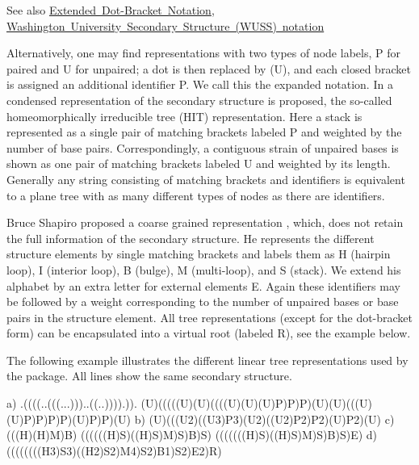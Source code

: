 \begin{DoxySeeAlso}{See also}
\mbox{\hyperlink{rna_structure_notations_dot-bracket-ext-notation}{Extended Dot-\/\+Bracket Notation}}, \mbox{\hyperlink{rna_structure_notations_wuss-notation}{Washington University Secondary Structure (W\+U\+SS) notation}}
\end{DoxySeeAlso}
Alternatively, one may find representations with two types of node labels, \textquotesingle{}P\textquotesingle{} for paired and \textquotesingle{}U\textquotesingle{} for unpaired; a dot is then replaced by \textquotesingle{}(U)\textquotesingle{}, and each closed bracket is assigned an additional identifier \textquotesingle{}P\textquotesingle{}. We call this the expanded notation. In \cite{fontana:1993b} a condensed representation of the secondary structure is proposed, the so-\/called homeomorphically irreducible tree (H\+IT) representation. Here a stack is represented as a single pair of matching brackets labeled \textquotesingle{}P\textquotesingle{} and weighted by the number of base pairs. Correspondingly, a contiguous strain of unpaired bases is shown as one pair of matching brackets labeled \textquotesingle{}U\textquotesingle{} and weighted by its length. Generally any string consisting of matching brackets and identifiers is equivalent to a plane tree with as many different types of nodes as there are identifiers.

Bruce Shapiro proposed a coarse grained representation \cite{shapiro:1988}, which, does not retain the full information of the secondary structure. He represents the different structure elements by single matching brackets and labels them as \textquotesingle{}H\textquotesingle{} (hairpin loop), \textquotesingle{}I\textquotesingle{} (interior loop), \textquotesingle{}B\textquotesingle{} (bulge), \textquotesingle{}M\textquotesingle{} (multi-\/loop), and \textquotesingle{}S\textquotesingle{} (stack). We extend his alphabet by an extra letter for external elements \textquotesingle{}E\textquotesingle{}. Again these identifiers may be followed by a weight corresponding to the number of unpaired bases or base pairs in the structure element. All tree representations (except for the dot-\/bracket form) can be encapsulated into a virtual root (labeled \textquotesingle{}R\textquotesingle{}), see the example below.

The following example illustrates the different linear tree representations used by the package. All lines show the same secondary structure.

\begin{DoxyVerb}a) .((((..(((...)))..((..)))).)).
   (U)(((((U)(U)((((U)(U)(U)P)P)P)(U)(U)(((U)(U)P)P)P)P)(U)P)P)(U)
b) (U)(((U2)((U3)P3)(U2)((U2)P2)P2)(U)P2)(U)
c) (((H)(H)M)B)
   ((((((H)S)((H)S)M)S)B)S)
   (((((((H)S)((H)S)M)S)B)S)E)
d) ((((((((H3)S3)((H2)S2)M4)S2)B1)S2)E2)R)
\end{DoxyVerb}


